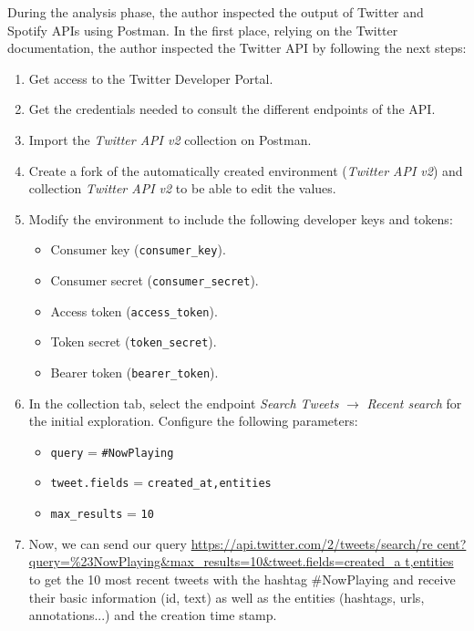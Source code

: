 \nonzeroparskip During the analysis phase, the author inspected the output of Twitter and Spotify APIs using Postman. In the first place, relying on the Twitter documentation, the author inspected the Twitter API by following the next steps:
\begin{enumerate}
	\item Get access to the Twitter Developer Portal.
	\item Get the credentials needed to consult the different endpoints of the API.
	\item Import the \textit{Twitter API v2} collection on Postman.
	\item Create a fork of the automatically created environment (\textit{Twitter API v2}) and collection \textit{Twitter API v2} to be able to edit the values.
	\item Modify the environment to include the following developer keys and tokens:
	\begin{itemize}
		\item Consumer key (\texttt{consumer\_key}).
		\item Consumer secret (\texttt{consumer\_secret}).
		\item Access token (\texttt{access\_token}).
		\item Token secret (\texttt{token\_secret}).
		\item Bearer token (\texttt{bearer\_token}).
	\end{itemize}
	\item In the collection tab, select the endpoint \textit{Search Tweets} $\longrightarrow$ \textit{Recent search} for the initial exploration. Configure the following parameters:
	\begin{itemize}
		\item \texttt{query} = \texttt{\#NowPlaying}
		\item \texttt{tweet.fields} = \texttt{created\_at,entities}
		\item \texttt{max\_results} = \texttt{10}
	\end{itemize}
	\item Now, we can send our query \url{https://api.twitter.com/2/tweets/search/re cent?query=\%23NowPlaying\&max\_results=10\&tweet.fields=created\_a t,entities} to get the 10 most recent tweets with the hashtag \#NowPlaying and receive their basic information (id, text) as well as the entities (hashtags, urls, annotations...) and the creation time stamp.
\end{enumerate}

